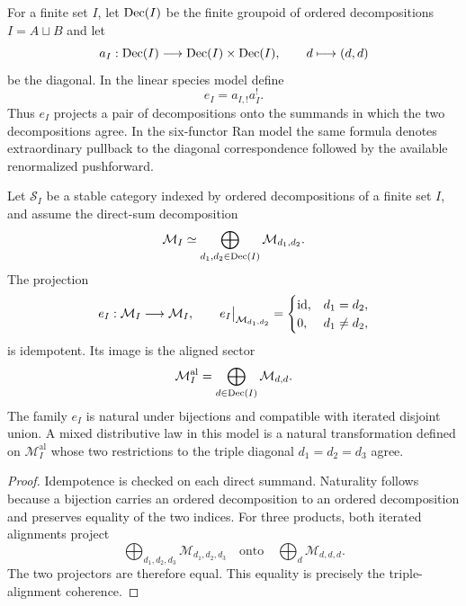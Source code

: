\begin{definition}
For a finite set $I$, let $\operatorname{Dec}(I)$ be the finite groupoid of ordered decompositions $I=A\sqcup B$ and let
\[
 a_I:\operatorname{Dec}(I)\longrightarrow\operatorname{Dec}(I)\times\operatorname{Dec}(I),\qquad d\longmapsto(d,d)
\]
be the diagonal.  In the linear species model define
\[
 e_I=a_{I,!}a_I^!.
\]
Thus $e_I$ projects a pair of decompositions onto the summands in which the two decompositions agree.  In the six-functor Ran model the same formula denotes extraordinary pullback to the diagonal correspondence followed by the available renormalized pushforward.
\end{definition}

\begin{theorem}
Let $\mathcal S_I$ be a stable category indexed by ordered decompositions of a finite set $I$, and assume the direct-sum decomposition
\[
 \mathcal M_I\simeq\bigoplus_{d_1,d_2\in\operatorname{Dec}(I)}\mathcal M_{d_1,d_2}.
\]
The projection
\[
 e_I:\mathcal M_I\longrightarrow\mathcal M_I,
 \qquad
 e_I\big|_{\mathcal M_{d_1,d_2}}=
 \begin{cases}\operatorname{id},&d_1=d_2,\\0,&d_1\ne d_2,
 \end{cases}
\]
is idempotent.  Its image is the aligned sector
\[
 \mathcal M_I^{\mathrm{al}}
 =\bigoplus_{d\in\operatorname{Dec}(I)}\mathcal M_{d,d}.
\]
The family $e_I$ is natural under bijections and compatible with iterated disjoint union.  A mixed distributive law in this model is a natural transformation defined on $\mathcal M_I^{\mathrm{al}}$ whose two restrictions to the triple diagonal $d_1=d_2=d_3$ agree.
\end{theorem}
\begin{proof}
Idempotence is checked on each direct summand.  Naturality follows because a bijection carries an ordered decomposition to an ordered decomposition and preserves equality of the two indices.  For three products, both iterated alignments project
\[
 \bigoplus_{d_1,d_2,d_3}\mathcal M_{d_1,d_2,d_3}
 \quad\text{onto}\quad
 \bigoplus_d\mathcal M_{d,d,d}.
\]
The two projectors are therefore equal.  This equality is precisely the triple-alignment coherence.
\end{proof}

